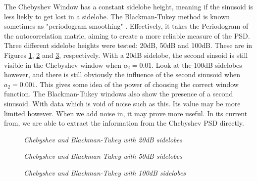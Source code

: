 \documentclass[./main.tex]{subfiles}
\begin{document}
The Chebyshev Window has a constant sidelobe height, meaning if the sinusoid is less liekly to get lost in a sidelobe. The Blackman-Tukey method is known sometimes as "periodogram smoothing" \cite{Mandic2014}. Effectively, it takes the Periodogram of the autocorrelation matric, aiming to create a more reliable measure of the PSD. Three different sidelobe heights were tested: 20dB, 50dB and 100dB. These are in Figures \ref{fig:1_3_f_20}, \ref{fig:1_3_f_50} and \ref{fig:1_3_f_100}, respectively. With a 20dB sidelobe, the second sinsoid is still visible in the Chebyshev window when $a_2 = 0.01$. Look at the 100dB sidelobes however, and there is still obviously the influence of the second sinusoid when $a_2=0.001$. This gives some idea of the power of choosing the correct window function. The Blackman-Tukey windows also show the presence of a second sinusoid. With data which is void of noise such as this. Its value may be more limited however. When we add noise in, it may prove more useful. In its current from, we are able to extract the information from the Chebyshev PSD directly.

\begin{figure}[h]
	\centering 
	\resizebox{\textwidth}{!}{}
	\caption{\textit{Chebyshev and Blackman-Tukey with 20dB sidelobes}}
	\label{fig:1_3_f_20}
\end{figure}

\begin{figure}[h]
	\centering 
	\resizebox{\textwidth}{!}{}
	\caption{\textit{Chebyshev and Blackman-Tukey with 50dB sidelobes}}
	\label{fig:1_3_f_50}
\end{figure}

\begin{figure}[h]
	\centering 
	\resizebox{\textwidth}{!}{}
	\caption{\textit{Chebyshev and Blackman-Tukey with 100dB sidelobes}}
	\label{fig:1_3_f_100}
\end{figure}
\end{document}
